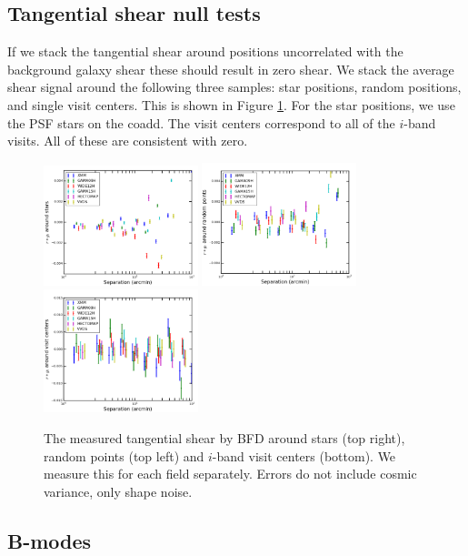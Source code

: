 \documentclass[useAMS,usenatbib]{mnras}
\begin{document}
\subsection{Tangential shear null tests}
If we stack the tangential shear around positions uncorrelated with the background galaxy shear these should result in zero shear.  We stack the average shear signal around the following three samples: star positions, random positions, and single visit centers.  This is shown in Figure \ref{fig:gt_null}.  For the star positions, we use the PSF stars on the coadd.  The visit centers correspond to all of the $i$-band visits.  All of these are consistent with zero.
\begin{figure}
    \includegraphics[width=0.4\textwidth]{gt_star.png}
    \includegraphics[width=0.4\textwidth]{gt_random.png}
    \includegraphics[width=0.4\textwidth]{gt_visit.png}
    \caption{
    The measured tangential shear by BFD around stars (top right), random points (top left) and $i$-band visit centers (bottom).  We measure this for each field separately.  Errors do not include cosmic variance, only shape noise.
    }
    \label{fig:gt_null}
\end{figure}

\subsection{B-modes}
\end{document}
